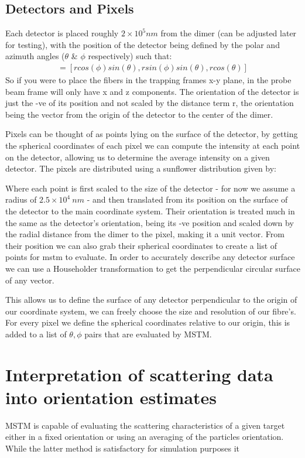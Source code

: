 \documentclass[a4paper,oneside,11pt]{book}
\begin{document}
\subsection{Detectors and Pixels}

Each detector is placed roughly $2\times 10^5 nm$ from the dimer (can be adjusted later for testing), with the position of the detector being defined by the polar and azimuth angles ($\theta$ \& $\phi$ respectively) such that:
\begin{align}
	[x_{fiber}, y_{fiber}, z_{fiber}] = [rcos(\phi)sin(\theta), rsin(\phi)sin(\theta), rcos(\theta)]
\end{align}
So if you were to place the fibers in the trapping frames x-y plane, in the probe beam frame will only have x and z components. The orientation of the detector is just the -ve of its position and not scaled by the distance term r, the orientation being the vector from the origin of the detector to the center of the dimer. 

Pixels can be thought of as points lying on the surface of the detector, by getting the spherical coordinates of each pixel we can compute the intensity at each point on the detector, allowing us to determine the average intensity on a given detector. The pixels are distributed using a sunflower distribution given by:

Where each point is first scaled to the size of the detector - for now we assume a radius of $2.5 \times 10^4 \ nm$ - and then translated from its position on the surface of the detector to the main coordinate system. Their orientation is treated much in the same as the detector's orientation, being its -ve position and scaled down by the radial distance from the dimer to the pixel, making it a unit vector. From their position we can also grab their spherical coordinates to create a list of points for mstm to evaluate. In order to accurately describe any detector surface we can use a Householder transformation to get the perpendicular circular surface of any vector.

This allows us to define the surface of any detector perpendicular to the origin of our coordinate system, we can freely choose the size and resolution of our fibre's. For every pixel we define the spherical coordinates relative to our origin, this is added to a list of $\theta, \phi$ pairs that are evaluated by MSTM. 

\section{Interpretation of scattering data into orientation estimates}
MSTM is capable of evaluating the scattering characteristics of a given target either in a fixed orientation or using an averaging of the particles orientation. While the latter method is satisfactory for simulation purposes it 
\end{document}
